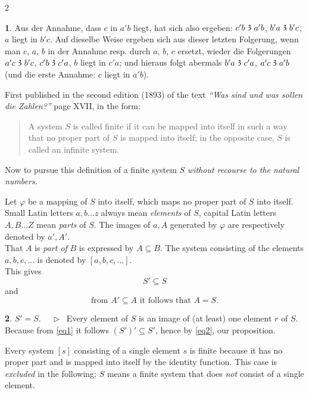 \documentclass[leqno,hidelinks,10pt]{article}
\theoremstyle{definition}
\newtheorem{satz}{\protect\satzname}
\newcommand{\satzname}{}
\renewcommand{\satzname}{\hspace{-4pt}.\ Satz}%
\renewcommand{\satzname}{\hspace{-4pt}.\ Theorem}%
\newcommand\Beweis{\medskip \newline $ \phantom{'.'} \rhd \ $}%
\newcommand\TeilVon{\mathrel{\raisebox{0.45ex}{$\mathfrak{3}$}}}
\newcommand{\partof}{\subseteq}
\begin{document}
\begin{paracol}{2}
\begin{leftcolumn}
\begin{satz}
Aus der Annahme, dass $c$ in $a'b$ liegt, hat sich also ergeben: $c'b \TeilVon a'b$,
$b'a \TeilVon b'c$, $a$ liegt in $b'c$. Auf dieselbe Weise ergeben sich aus
dieser letzten Folgerung, wenn man $c$, $a$, $b$ in der Annahme resp. durch $a$,
$b$, $c$ ersetzt, wieder die Folgerungen $a'c \TeilVon b'c$, $c'b \TeilVon c'a$,
$b$ liegt in $c'a$; und hieraus folgt abermals $b'a \TeilVon c'a$,
$a'c \TeilVon a'b$ (und die erste Annahme: $c$ liegt in $a'b$).
\end{satz}
\newpage
\end{leftcolumn}


\begin{rightcolumn}


\noindent First published in the second edition (1893) of the text
\textit{``Was sind und was sollen die Zahlen?''} page XVII, in the form:%

\begin{quote}
A system $S$ is called finite if it can be mapped into itself in such a way that
no proper part of $S$ is mapped into itself; in the opposite case, $S$ is called
an infinite system.
\end{quote}

Now to pursue this definition of a finite system $S$ \emph{without recourse to the natural numbers}.

Let $\varphi$ be a mapping of $S$ into itself, which maps no proper part of $S$
into itself. Small Latin letters $a, b \ldots z$ always mean \emph{elements} of
$S$, capital Latin letters $A, B \ldots Z$ mean \emph{parts} of $S$. The images
of $a, A$ generated by $\varphi$ are respectively denoted by $a', A'$.
\ \\

That $A$ is \emph{part of} $B$ is expressed by $A \partof B$. The system consisting
of the elements $a, b, c, \ldots$ is denoted by $[a, b, c, \ldots]$.
\ \\

This gives
\begin{equation}\label{eq1}
                S' \partof S
\end{equation}
and %
\begin{equation}\label{eq2}
        \text{from } A' \partof A \text{ it follows that } A = S.
\end{equation}

\begin{satz}\label{thm1}$S' = S$.
\Beweis
Every element of $S$ is an image of (at least) one element $r$ of $S$. Because
from \eqref{eq1} it follows $(S')' \partof S'$, hence by \eqref{eq2}, our proposition.
\end{satz}
Every system $[s]$ consisting of a single element $s$ is finite because it has
no proper part and is mapped into itself by the identity function. This case is
\emph{excluded} in the following; $S$ means a finite system that does \emph{not}
consist of a single element.


\end{rightcolumn}
\end{paracol}
\end{document}
